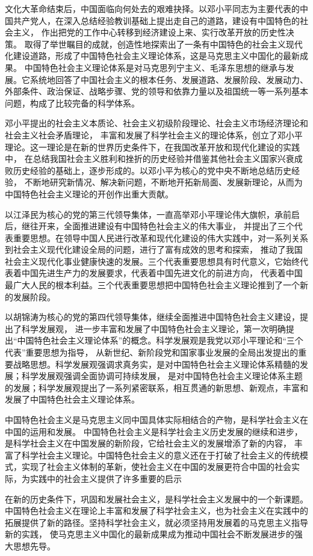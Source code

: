 \documentclass{article}
\begin{document}
文化大革命结束后，中国面临向何处去的艰难抉择。以邓小平同志为主要代表的中国共产党人，在深入总结经验教训基础上提出走自己的道路，建设有中国特色的社会主义，
作出把党的工作中心转移到经济建设上来、实行改革开放的历史性决策。
取得了举世瞩目的成就，创造性地探索出了一条有中国特色的社会主义现代化建设道路，形成了中国特色社会主义理论体系，这是马克思主义中国化的最新成果。
中国特色社会主义理论体系是对马克思列宁主义、毛泽东思想的继承与发展。它系统地回答了中国社会主义的根本任务、发展道路、发展阶段、发展动力、外部条件、政治保证、战略步骤、党的领导和依靠力量以及祖国统一等一系列基本问题，构成了比较完备的科学体系。

邓小平提出的社会主义本质论、社会主义初级阶段理论、社会主义市场经济理论和社会主义社会矛盾理论，
丰富和发展了科学社会主义的理论体系，创立了邓小平理论。这一理论是在新的世界历史条件下，在我国改革开放和现代化建设的实践中，
在总结我国社会主义胜利和挫折的历史经验并借鉴其他社会主义国家兴衰成败历史经验的基础上，逐步形成的。以邓小平为核心的党中央不断地总结历史经验，
不断地研究新情况、解决新问题，不断地开拓新局面、发展新理论，从而为中国特色社会主义理论的开创作出重大贡献。

以江泽民为核心的党的第三代领导集体，一直高举邓小平理论伟大旗帜，承前启后，继往开来，全面推进建设有中国特色社会主义的伟大事业，
并提出了三个代表重要思想。在领导中国人民进行改革和现代化建设的伟大实践中，对一系列关系到社会主义现代化建设全局的问题，进行了富有成效的思考和探索，
推动了我国社会主义现代化事业健康快速的发展。三个代表重要思想具有时代意义，它始终代表着中国先进生产力的发展要求，代表着中国先进文化的前进方向，
代表着中国最广大人民的根本利益。三个代表重要思想把中国特色社会主义理论推到了一个新的发展阶段。

以胡锦涛为核心的党的第四代领导集体，继续全面推进中国特色社会主义建设，提出了科学发展观，
进一步丰富和发展了中国特色社会主义理论，第一次明确提出“中国特色社会主义理论体系”的概念。科学发展观是我党以邓小平理论和“三个代表”重要思想为指导，
从新世纪、新阶段党和国家事业发展的全局出发提出的重要战略思想。科学发展观强调求真务实，是对中国特色社会主义理论体系精髓的发展；科学发展观强调全面协调可持续发展，
是对中国特色社会主义理论体系主题的发展；科学发展观提出了一系列紧密联系，相互贯通的新思想、新观点，丰富和发展了中国特色社会主义理论体系。

中国特色社会主义是马克思主义同中国具体实际相结合的产物，是科学社会主义在中国的运用和发展。
中国特色社会主义是科学社会主义历史发展的继续和进步，是科学社会主义在中国发展的新阶段，它给社会主义的发展增添了新的内容，
丰富了科学社会主义理论。中国特色社会主义的意义还在于打破了社会主义的传统模式，实现了社会主义体制的革新，使社会主义在中国的发展更符合中国的社会实际，为实践中的社会主义提供了许多重要的启示

在新的历史条件下，巩固和发展社会主义，是科学社会主义发展中的一个新课题。
中国特色社会主义在理论上丰富和发展了科学社会主义，也为社会主义在实践中的拓展提供了新的路径。坚持科学社会主义，就必须坚持用发展着的马克思主义指导新的实践，
使马克思主义中国化的最新成果成为推动中国社会不断发展进步的强大思想先导。
\end{document}
